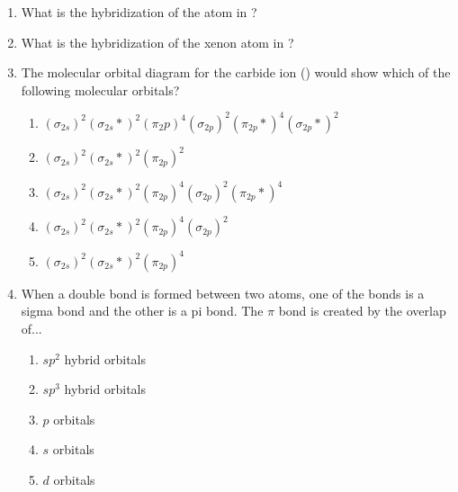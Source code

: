 \documentclass[main.tex]{subfiles}
\begin{document}
\begin{fullwidth}
\begin{multicols*}{2}
\begin{enumerate}
\item What is the hybridization of the   atom in  ?
\begin{enumerate}[label=(\alph*)]\vspace{-0.5cm}
\end{enumerate}\vspace{-0.5cm}

\item What is the hybridization of the xenon atom in ?
\begin{enumerate}[label=(\alph*)]\vspace{-0.5cm}
\end{enumerate}\vspace{-0.5cm}

\item The molecular orbital diagram for the carbide ion () would show which of the following molecular orbitals?
\begin{enumerate}[label=(\alph*)] 
\item  $(\sigma_{2s})^2 (\sigma_{2s}*)^2 (\pi_2p)^4 (\sigma_{2p})^2 (\pi_{2p}*)^4 (\sigma_{2p}*)^2$	
\item  $(\sigma_{2s})^2 (\sigma_{2s}*)^2 (\pi_{2p})^2	$		
\item  $(\sigma_{2s})^2 (\sigma_{2s}*)^2 (\pi_{2p})^4 (\sigma_{2p})^2 (\pi_{2p}*)^4$ 
\item  $(\sigma_{2s})^2 (\sigma_{2s}*)^2 (\pi_{2p})^4 (\sigma_{2p})^2$	
\item  $(\sigma_{2s})^2 (\sigma_{2s}*)^2 (\pi_{2p})^4$	
\end{enumerate} 
		
\item When a double bond is formed between two atoms, one of the bonds is a sigma bond and the other is a pi bond. The $\pi$  bond is created by the overlap of...
\begin{enumerate}[label=(\alph*)]
\item  $sp^2$ hybrid orbitals
\item  $sp^3$ hybrid orbitals
\item  $p$ orbitals
\item  $s$ orbitals
\item  $d$ orbitals
\end{enumerate}
		

\end{enumerate}
\end{multicols*}
\end{fullwidth}
\end{document}
